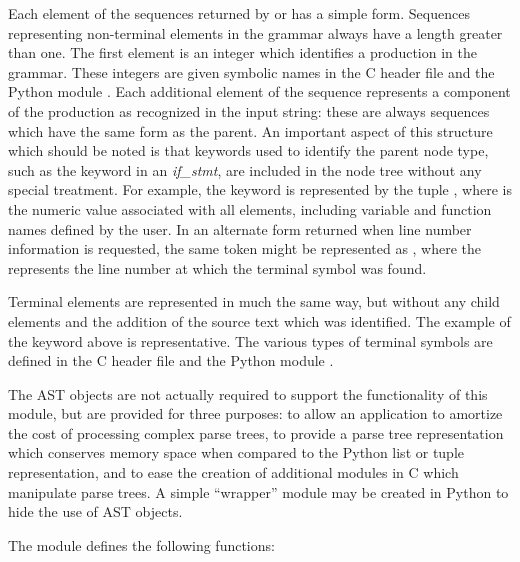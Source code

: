 Each element of the sequences returned by  or
 has a simple form.  Sequences representing
non-terminal elements in the grammar always have a length greater than
one.  The first element is an integer which identifies a production in
the grammar.  These integers are given symbolic names in the C header
file  and the Python module
.  Each additional element of the sequence represents
a component of the production as recognized in the input string: these
are always sequences which have the same form as the parent.  An
important aspect of this structure which should be noted is that
keywords used to identify the parent node type, such as the keyword
 in an \emph{if\_stmt}, are included in the node tree without
any special treatment.  For example, the  keyword is
represented by the tuple , where  is the
numeric value associated with all  elements, including
variable and function names defined by the user.  In an alternate form
returned when line number information is requested, the same token
might be represented as , where the 
represents the line number at which the terminal symbol was found.

Terminal elements are represented in much the same way, but without
any child elements and the addition of the source text which was
identified.  The example of the  keyword above is
representative.  The various types of terminal symbols are defined in
the C header file  and the Python module
.

The AST objects are not actually required to support the functionality
of this module, but are provided for three purposes: to allow an
application to amortize the cost of processing complex parse trees, to
provide a parse tree representation which conserves memory space when
compared to the Python list or tuple representation, and to ease the
creation of additional modules in C which manipulate parse trees.  A
simple ``wrapper'' module may be created in Python to hide the use of
AST objects.


The  module defines the following functions:

\renewcommand{\indexsubitem}{(in module parser)}

